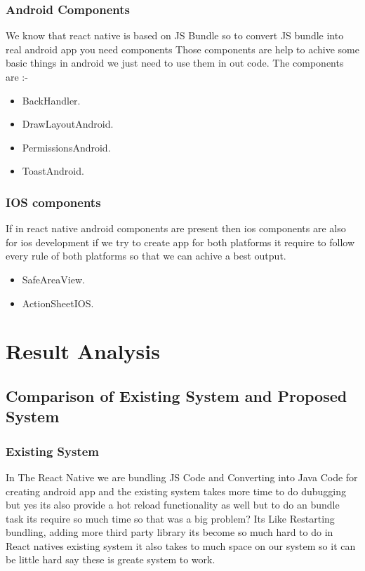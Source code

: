 \documentclass[12pt,a4paper]{report}
\begin{document}
\subsection{Android Components}
We know that react native is based on JS Bundle so to convert JS bundle into real android app you need components Those components are help to achive some basic things in android  we just need to use them in out code. The components are  :- 
\\
\begin{itemize}
  \item BackHandler.
  \item DrawLayoutAndroid.
  \item PermissionsAndroid.
  \item ToastAndroid.
\end{itemize}

\subsection{IOS components}
If in react native android components are present then ios components are also for ios development if we try to create app for both platforms it require to follow every rule of both platforms so that we can achive a best output.

\begin{itemize}
  \item SafeAreaView.
  \item ActionSheetIOS.
\end{itemize}

\newpage

\chapter{Result Analysis}
\section{Comparison of Existing System and Proposed System}
\subsection{ Existing System}
In The React Native we are bundling JS Code and Converting into Java Code for creating android app and the existing system takes more time to do dubugging but yes its also provide a hot reload functionality as well but to do an bundle task its require so much time so that was a big problem? Its Like Restarting bundling, adding more third party library its become so much hard to do in React natives existing system it also takes to much space on our system so it can be little hard say these is greate system to work.
\end{document}
